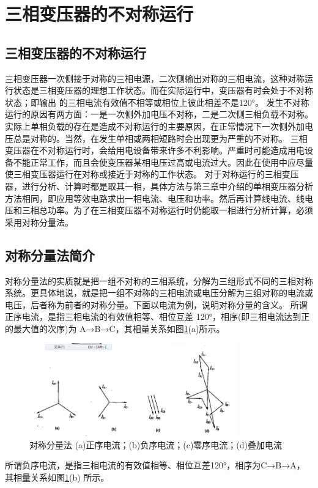 \documentclass{book}
\begin{document}
\section{三相变压器的不对称运行}
\subsection{三相变压器的不对称运行}
三相变压器一次侧接于对称的三相电源，二次侧输出对称的三相电流，这种对称运行状态是三相变压器的理想工作状态。而在实际运行中，变压器有时会处于不对称状态；即输出 的三相电流有效值不相等或相位上彼此相差不是120°。
发生不对称运行的原因有两方面：一是一次侧外加电压不对称，二是二次侧三相负载不对称。实际上单相负载的存在是造成不对称运行的主要原因，在正常情况下一次侧外加电压总是对称的。当然，在发生单相或两相短路时会出现更为严重的不对称。
三相变压器在不对称运行时，会给用电设备带来许多不利影响。严重时可能造成用电设备不能正常工作，而且会使变压器某相电压过高或电流过大。因此在使用中应尽量使三相变压器运行在对称或接近于对称的工作状态。
对于对称运行的三相变压器，进行分析、计算时都是取其一相，具体方法与第三章中介绍的单相变压器分析方法相同，即应用等效电路求出一相电流、电压和功率。然后再计算线电流、线电压和三相总功率。为了在三相变压器不对称运行时仍能取一相进行分析计算，必须采用对称分量法。

\subsection{对称分量法简介}
对称分量法的实质就是把一组不对称的三相系统，分解为三组形式不同的三相对称系统。更具体地说，就是把一组不对称的三相电流或电压分解为三组对称的电流或电压，后者称为前者的对称分量。下面以电流为例，说明对称分量的含义。
所谓正序电流，是指三相电流的有效值相等、相位互差 120°，相序(即三相电流达到正的最大值的次序)为 A→B→C，其相量关系如图\ref{fig_4.17}(a)所示。
\begin{figure}[H]
	\centering
	\includegraphics[width=0.80\textwidth]{4-17.png}
	\caption{对称分量法
		(a)正序电流；(b)负序电流；(c)零序电流；(d)叠加电流}
	\label{fig_4.17}
\end{figure}
所谓负序电流，是指三相电流的有效值相等、相位互差120°，相序为C→B→A，其相量关系如图\ref{fig_4.17}(b) 所示。
\end{document}
